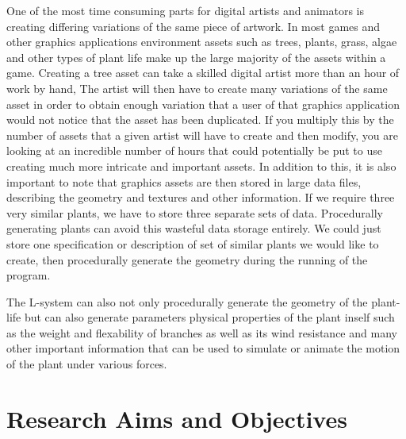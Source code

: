 \begin{flushleft}

One of the most time consuming parts for digital artists and animators is creating differing variations of the same piece of artwork. In most games and other graphics applications environment assets such as trees, plants, grass, algae and other types of plant life make up the large majority of the assets within a game. Creating a tree asset can take a skilled digital artist more than an hour of work by hand, The artist will then have to create many variations of the same asset in order to obtain enough variation that a user of that graphics application would not notice that the asset has been duplicated. If you multiply this by the number of assets that a given artist will have to create and then modify, you are looking at an incredible number of hours that could potentially be put to use creating much more intricate and important assets. In addition to this, it is also important to note that graphics assets are then stored in large data files, describing the geometry and textures and other information. If we require three very similar plants, we have to store three separate sets of data. Procedurally generating plants can avoid this wasteful data storage entirely. We could just store one specification or description of set of similar plants we would like to create, then procedurally generate the geometry during the running of the program. \\

\vspace{5mm} 

The L-system can also not only procedurally generate the geometry of the plant-life but can also generate parameters physical properties of the plant inself such as the weight and flexability of branches as well as its wind resistance and many other important information that can be used to simulate or animate the motion of the plant under various forces. \\

\end{flushleft}

\section{Research Aims and Objectives}

